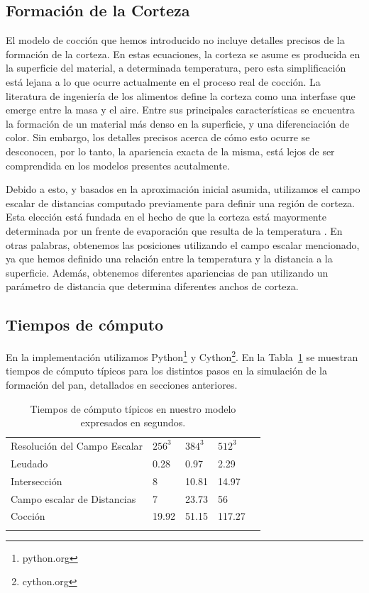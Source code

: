 \documentclass[spanish,a4paper,openright,11pt]{book}
\begin{document}
\subsection{Formación de la Corteza}
El modelo de cocción que hemos introducido no incluye detalles precisos de la formación de la corteza.
En estas ecuaciones, la corteza se asume es producida en la superficie del material, a determinada temperatura, pero esta simplificación está lejana a lo que ocurre actualmente en el proceso real de cocción.
La literatura de ingeniería de los alimentos define la corteza como una interfase que emerge entre la masa y el aire.
Entre sus principales características se encuentra la formación de un material más denso en la superficie, y una diferenciación de color.
Sin embargo, los detalles precisos acerca de cómo esto ocurre se desconocen, por lo tanto, la apariencia exacta de la misma, está lejos de ser comprendida en los modelos presentes acutalmente.

Debido a esto, y basados en la aproximación inicial asumida, utilizamos el campo escalar de distancias computado previamente para definir una región de corteza.
Esta elección está fundada en el hecho de que la corteza está mayormente determinada por un frente de evaporación que resulta de la temperatura \cite{Jefferson2007}.
En otras palabras, obtenemos las posiciones utilizando el campo escalar mencionado, ya que hemos definido una relación entre la temperatura y la distancia a la superficie.
Además, obtenemos diferentes apariencias de pan utilizando un parámetro de distancia que determina diferentes anchos de corteza.
\subsection{Tiempos de cómputo}
En la implementación utilizamos Python\footnote{python.org} y Cython\footnote{cython.org}.
En la Tabla~\ref{tab:computingtimes} se muestran tiempos de cómputo típicos para los distintos pasos en la simulación de la formación del pan, detallados en secciones anteriores. %

\begin{table}[h!]
\begin{tabular}{lllll}
\hline\noalign{\smallskip}
Resolución del Campo Escalar & $256^{3}$ & $384^{3}$  & $512^{3}$ \\
\noalign{\smallskip}\hline\noalign{\smallskip}
Leudado & 0.28 & 0.97 & 2.29 \\
Intersección & 8 & 10.81 & 14.97 \\
Campo escalar de Distancias & 7 & 23.73 & 56 \\
Cocción & 19.92 & 51.15 & 117.27 \\
\noalign{\smallskip}\hline
\end{tabular}
\caption{Tiempos de cómputo típicos en nuestro modelo expresados en segundos.}
\label{tab:computingtimes}
\end{table}
\end{document}
